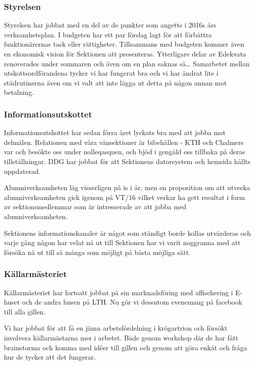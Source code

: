 \documentclass[../_main/handlingar.tex]{subfiles}
\begin{document}

\subsubsection*{Styrelsen}
Styrelsen har jobbat med en del av de punkter som angetts i 2016s års verksamhetsplan. I budgeten har ett par förslag lagt för att förbättra funktionärernas tack eller rättigheter. Tillsammans med budgeten kommer även en ekonomisk vision för Sektionen att presenteras. Ytterligare delar av Edekvata renoverades under sommaren och även om en plan saknas så… Samarbetet mellan utskottsordförandena tycker vi har fungerat bra och vi har ändrat lite i städrutinerna även om vi valt att inte lägga ut detta på någon annan mot betalning.

\subsubsection*{Informationsutskottet}
Informationsutskottet har sedan förra året lyckats bra med att jobba mot delmålen. Relationen med våra vänsektioner är bibehållen - KTH och Chalmers var och besökte oss under nolleqasquen, och bjöd i gengäld oss tillbaka på deras tillställningar. DDG har jobbat för att Sektionens datorsystem och hemsida hållts uppdaterad.

Alumniverksamheten låg visserligen på is i år, men en proposition om att utvecka alumniverksamheten gick igenom på VT/16 vilket verkar ha gett resultat i form av sektionsmedlemmar som är intresserade av att jobba med alumniverksamheten.

Sektionens informationskanaler är något som ständigt borde kollas utvärderas och varje gång någon har velat nå ut till Sektionen har vi varit noggranna med att försöka nå ut till så många som möjligt på bästa möjliga sätt.

\subsubsection*{Källarmästeriet}
Källarmästeriet har fortsatt jobbat på sin marknadsföring med affischering i E-huset och de andra husen på LTH. Nu gör vi dessutom evenemang på facebook till alla gillen.

Vi har jobbat för att få en jämn arbetsfördelning i krögartrion och försökt involvera källarmästarna mer i arbetet. Både genom workshop där de har fått brainstorma och komma med idéer till gillen och genom att göra enkät och fråga hur de tycker att det fungerar.
\end{document}
